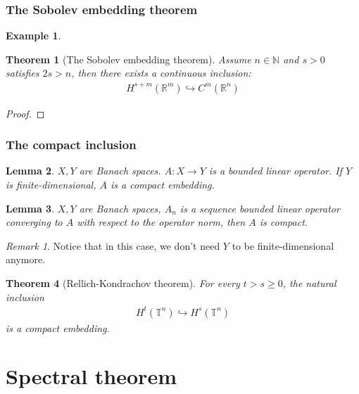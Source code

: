 \documentclass[a4paper,11pt,fleqn]{book}
\newtheorem{theorem}{Theorem}[section]
\newtheorem{lemma}[theorem]{Lemma}
\theoremstyle{definition}
\newtheorem*{example}{Example}
\theoremstyle{remark}
\newtheorem*{remark}{Remark}
\begin{document}
\subsubsection{The Sobolev embedding theorem}
\begin{example}
	
\end{example}

\begin{theorem}[The Sobolev embedding theorem]
Assume $n \in \mathbb{N}$ and $s > 0$ satisfies $2s > n$, then there exists a continuous inclusion:
\begin{align*}
	H^{s + m}(\mathbb{R}^m) \hookrightarrow C^m(\mathbb{R}^n)
\end{align*}
\end{theorem}
\begin{proof}
	
\end{proof}


\subsubsection{The compact inclusion}
\begin{lemma}
	$X, Y$ are Banach spaces. $A: X\rightarrow Y$ is a bounded linear operator. If $Y$ is finite-dimensional, $A$ is a compact embedding.
\end{lemma}

\begin{lemma}
	$X, Y$ are Banach spaces, $A_n$ is a sequence bounded linear operator converging to $A$ with respect to the operator norm, then $A$ is compact.
\end{lemma}
\begin{remark}
Notice that in this case, we don't need $Y$ to be finite-dimensional anymore.	
\end{remark}




\begin{theorem}[Rellich-Kondrachov theorem]
	For every $t > s \geq 0$, the natural inclusion
	\begin{align*}
		H^t(\mathbb{T}^n) \hookrightarrow H^s(\mathbb{T}^n)
	\end{align*}
	is a compact embedding.
\end{theorem}



\newpage
\section{Spectral theorem}
\end{document}
